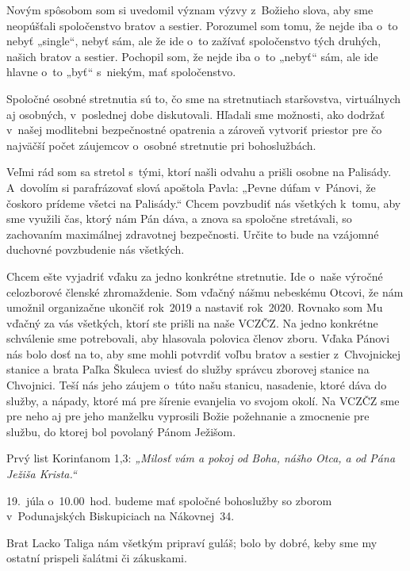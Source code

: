 Novým spôsobom som si uvedomil význam výzvy z~Božieho slova, aby sme neopúšťali spoločenstvo bratov a sestier. Porozumel som tomu, že nejde iba o~to nebyť „single“, nebyť sám, ale že ide o~to zažívať spoločenstvo tých druhých, našich bratov a sestier. Pochopil som, že nejde iba o~to „nebyť“ sám, ale ide hlavne o~to „byť“ s~niekým, mať spoločenstvo.

Spoločné osobné stretnutia sú to, čo sme na stretnutiach staršovstva, virtuálnych aj osobných, v~poslednej dobe diskutovali. Hľadali sme možnosti, ako dodržať v~našej modlitebni bezpečnostné opatrenia a zároveň vytvoriť priestor pre čo najväčší počet záujemcov o~osobné stretnutie pri bohoslužbách.

Veľmi rád som sa stretol s~tými, ktorí našli odvahu a prišli osobne na Palisády. A~dovolím si parafrázovať slová apoštola Pavla: „Pevne dúfam v~Pánovi, že čoskoro prídeme všetci na Palisády.“ Chcem povzbudiť nás všetkých k~tomu, aby sme využili čas, ktorý nám Pán dáva, a znova sa spoločne stretávali, so zachovaním maximálnej zdravotnej bezpečnosti. Určite to bude na vzájomné duchovné povzbudenie nás všetkých.

Chcem ešte vyjadriť vďaku za jedno konkrétne stretnutie. Ide o~naše výročné celozborové členské zhromaždenie. Som vďačný nášmu nebeskému Otcovi, že nám umožnil organizačne ukončiť rok~2019 a nastaviť rok~2020. Rovnako som Mu vďačný za vás všetkých, ktorí ste prišli na naše VCZČZ. Na jedno konkrétne schválenie sme potrebovali, aby hlasovala polovica členov zboru. Vďaka Pánovi nás bolo dosť na to, aby sme mohli potvrdiť voľbu bratov a sestier z~Chvojnickej stanice a brata Paľka Škuleca uviesť do služby správcu zborovej stanice na Chvojnici. Teší nás jeho záujem o~túto našu stanicu, nasadenie, ktoré dáva do služby, a nápady, ktoré má pre šírenie evanjelia vo svojom okolí. Na VCZČZ sme pre neho aj pre jeho manželku vyprosili Božie požehnanie a zmocnenie pre službu, do ktorej bol povolaný Pánom Ježišom.

Prvý list Korinťanom 1,3: {\it „Milosť vám a pokoj od Boha, nášho Otca, a od Pána Ježiša Krista.“}



19.~júla o~10.00~hod. budeme mať spoločné bohoslužby so zborom v~Podunajských Biskupiciach na Nákovnej~34.

Brat Lacko Taliga nám všetkým pripraví guláš; bolo by dobré, keby sme my ostatní prispeli šalátmi či zákuskami.


